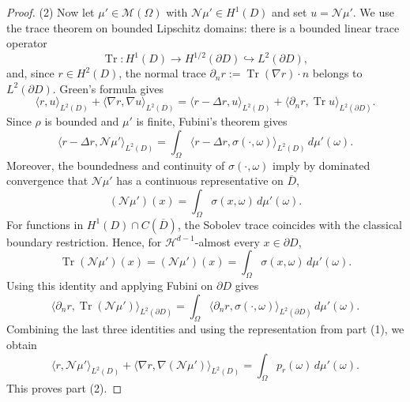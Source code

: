 \documentclass[11pt]{amsart}
\theoremstyle{definition}
\theoremstyle{remark}
\begin{document}
\begin{proof}
(2) Now let $\mu'\in\mathcal{M}(\Omega)$ with $\mathcal{N}\mu'\in H^1(D)$ and set
$u=\mathcal{N}\mu'$. We use the trace theorem on bounded Lipschitz domains:
there is a bounded linear trace operator
\begin{equation*}
	\operatorname{Tr}: H^1(D) \to H^{1/2}(\partial D) \hookrightarrow L^2(\partial D),
\end{equation*}
and, since $r\in H^2(D)$, the normal trace 
$\partial_n r := \operatorname{Tr}(\nabla r)\cdot n$ belongs to
$L^2(\partial D)$. Green's formula gives
\begin{equation*}
\langle r,u\rangle_{L^2(D)}
+
\langle \nabla r,\nabla u\rangle_{L^2(D)}
=
\langle r-\Delta r,u\rangle_{L^2(D)}
+
\langle \partial_n r,\operatorname{Tr}u\rangle_{L^2(\partial D)} .
\end{equation*}
Since $\rho$ is bounded and $\mu'$ is finite, Fubini's theorem gives
\begin{equation*}
\langle r-\Delta r,\mathcal{N}\mu'\rangle_{L^2(D)}
=
\int_\Omega
\langle r-\Delta r,\sigma(\cdot,\omega)\rangle_{L^2(D)}
\,d\mu'(\omega).
\end{equation*}
Moreover, the boundedness and continuity of $\sigma(\cdot,\omega)$ imply by
dominated convergence that $\mathcal{N}\mu'$ has a continuous representative on
$\overline D$,
\begin{equation*}
	(\mathcal{N}\mu')(x)=\int_\Omega \sigma(x,\omega)\,d\mu'(\omega).
\end{equation*}
For functions in $H^1(D)\cap C(\overline D)$, the Sobolev trace coincides with
the classical boundary restriction. Hence, for
$\mathcal{H}^{d-1}$-almost every $x\in\partial D$,
\begin{equation*}
	\operatorname{Tr}(\mathcal{N}\mu')(x)
	= (\mathcal{N}\mu')(x)
	= \int_\Omega \sigma(x,\omega)\,d\mu'(\omega).
\end{equation*}
Using this identity and applying Fubini on $\partial D$ gives
\begin{equation*}
\langle \partial_n r,\operatorname{Tr}(\mathcal{N}\mu')\rangle_{L^2(\partial D)}
=
\int_\Omega
\langle \partial_n r,\sigma(\cdot,\omega)\rangle_{L^2(\partial D)}
\,d\mu'(\omega).
\end{equation*}
Combining the last three identities and using the representation from part
(1), we obtain
\begin{equation*}
\langle r,\mathcal{N}\mu'\rangle_{L^2(D)}
+
\langle \nabla r,\nabla(\mathcal{N}\mu')\rangle_{L^2(D)}
=
\int_\Omega p_r(\omega)\,d\mu'(\omega).
\end{equation*}
This proves part (2).
\end{proof}
\end{document}
